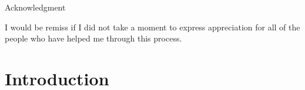 \documentclass[12pt]{report}
\numberwithin{definition}{section}
\begin{document}
\begin{center}
Acknowledgment
\end{center}
    I would be remiss if I did not take a moment to express appreciation for all of the people who have helped me through this process.
    





	
\break

\tableofcontents


\newcommand{\comment}[1]{}


\break


\pagestyle{myheadings}



\chapter{Introduction}
\end{document}
